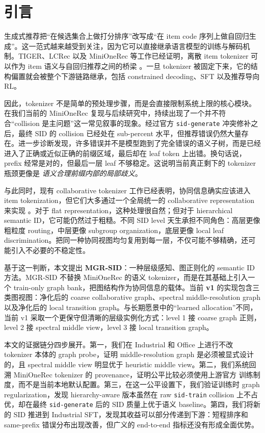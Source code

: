 \section{引言}

生成式推荐把“在候选集合上做打分排序”改写成“在 item code 序列上做自回归生成”。这一范式越来越受到关注，因为它可以直接继承语言模型的训练与解码机制。TIGER、LCRec 以及 MiniOneRec 等工作已经证明，离散 item tokenizer 可以作为 item 语义与自回归推荐之间的桥梁 \citep{rajput2023tiger,zheng2023lcrec,kong2025minionerec}。一旦 tokenizer 被固定下来，它的结构偏置就会被整个下游链路继承，包括 constrained decoding、SFT 以及推荐导向 RL。

因此，tokenizer 不是简单的预处理步骤，而是会直接限制系统上限的核心模块。在我们当前的 MiniOneRec 复现与后续研究中，持续出现了一个并不符合“collision 是主问题”这一常见叙事的现象。经过官方 \texttt{sid-generate} 冲突修补之后，最终 SID 的 collision 已经处在 sub-percent 水平，但推荐错误仍然大量存在。进一步诊断发现，许多错误并不是模型跑到了完全错误的语义子树，而是已经进入了正确或近似正确的前缀区域，最后却在 leaf token 上出错。换句话说，prefix 经常是对的，但最后一层 leaf 不够稳定。这说明当前真正剩下的 tokenizer 瓶颈更像是 \emph{语义合理前缀内部的局部歧义}。

与此同时，现有 collaborative tokenizer 工作已经表明，协同信息确实应该进入 item tokenization，但它们大多通过一个全局统一的 collaborative representation 来实现 \citep{fang2026prism,liang2026resid,wang2026pit,liu2025discrec}。对于 flat representation，这种处理很自然；但对于 hierarchical semantic ID，它可能仍然过于粗糙。不同 SID level 天生承担不同角色：高层更像粗粒度 routing，中层更像 subgroup organization，底层更像 local leaf discrimination。把同一种协同视图均匀复用到每一层，不仅可能不够精确，还可能引入不必要的不稳定性。

基于这一判断，本文提出 \textbf{MGR-SID}：一种层级感知、图正则化的 semantic ID 方法。MGR-SID 不替换 MiniOneRec 的语义 \rqvae{} tokenizer，而是在其基础上引入一个 train-only graph bank，把图结构作为协同信息的载体。当前 \textbf{v1} 的实现包含三类图视图：净化后的 coarse collaborative graph、spectral middle-resolution graph 以及净化后的 local transition graph。与长期愿景中的“learned allocation”不同，当前 v1 采取一个更保守但清晰的层级实例化方式：level 1 接 coarse graph 正则，level 2 接 spectral middle view，level 3 接 local transition graph。

本文的证据链分四步展开。第一，我们在 Industrial 和 Office 上进行不改 tokenizer 本体的 graph probe，证明 middle-resolution graph 是必须被显式设计的，且 spectral middle view 明显优于 heuristic middle view。第二，我们系统回溯 MiniOneRec tokenizer 的 provenance，证明公平比较必须使用上游官方 \rqvae{} 训练制度，而不是当前本地默认配置。第三，在这一公平设置下，我们验证训练时 graph regularization，发现 hierarchy-aware 版本虽然在 raw \texttt{sid-train} collision 上不占优，却在最终 \texttt{sid-generate} 后的 SID 质量上优于语义 baseline。第四，我们将新的 SID 推进到 Industrial SFT，发现其收益可以部分传递到下游：短程排序和 same-prefix 错误分布出现改善，但广义的 end-to-end 指标还没有形成全面优势。

